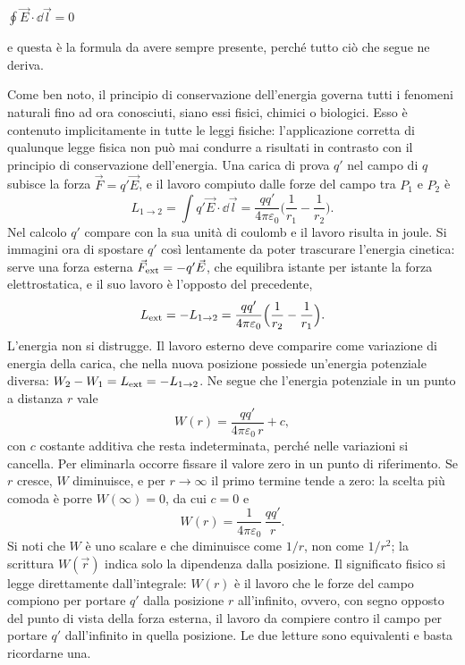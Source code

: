 \documentclass[11pt,a4paper]{article}
\begin{document}
\begin{center}
	\begin{tcolorbox}[colback=blue!5!white, colframe=blue!75!black, halign=center, width=0.55\textwidth, boxrule=1pt, arc=4pt]
		\Large
		$\displaystyle \oint\vec E\cdot\dd\vec l=0$
	\end{tcolorbox}
\end{center}

e questa è la formula da avere sempre presente, perché tutto ciò che segue ne deriva.


Come ben noto, il principio di conservazione dell’energia governa tutti i fenomeni naturali
fino ad ora conosciuti, siano essi fisici, chimici o biologici. Esso è contenuto implicitamente
in tutte le leggi fisiche: l’applicazione corretta di qualunque legge fisica non può mai
condurre a risultati in contrasto con il principio di conservazione dell’energia. Una carica di prova $q'$ nel campo di $q$ subisce la forza $\vec F=q'\vec E$, e il lavoro compiuto dalle forze del campo tra $P_1$ e $P_2$ è
\[
L_{1\to2}=\int q'\vec E\cdot\dd\vec l=\frac{qq'}{4\pi\varepsilon_0}\Big(\frac1{r_1}-\frac1{r_2}\Big).
\]
Nel calcolo $q'$ compare con la sua unità di coulomb e il lavoro risulta in joule. Si immagini ora di spostare $q'$ così lentamente da poter trascurare l'energia cinetica: serve una forza esterna $\vec F_{\rm ext}=-q'\vec E$, che equilibra istante per istante la forza elettrostatica, e il suo lavoro è l'opposto del precedente,
\[
L_{\rm ext}=-L_{1\to2}=\frac{qq'}{4\pi\varepsilon_0}\Big(\frac1{r_2}-\frac1{r_1}\Big).
\]
L'energia non si distrugge. Il lavoro esterno deve comparire come variazione di energia della carica, che nella nuova posizione possiede un'energia potenziale diversa: $W_2-W_1=L_{\rm ext}=-L_{1\to2}$. Ne segue che l'energia potenziale in un punto a distanza $r$ vale
\[
W(r)=\frac{qq'}{4\pi\varepsilon_0\,r}+c ,
\]
con $c$ costante additiva che resta indeterminata, perché nelle variazioni si cancella. Per eliminarla occorre fissare il valore zero in un punto di riferimento. Se $r$ cresce, $W$ diminuisce, e per $r\to\infty$ il primo termine tende a zero: la scelta più comoda è porre $W(\infty)=0$, da cui $c=0$ e
\[
W(r)=\frac{1}{4\pi\varepsilon_0}\,\frac{qq'}{r}.
\]
Si noti che $W$ è uno scalare e che diminuisce come $1/r$, non come $1/r^2$; la scrittura $W(\vec r)$ indica solo la dipendenza dalla posizione. Il significato fisico si legge direttamente dall'integrale: $W(r)$ è il lavoro che le forze del campo compiono per portare $q'$ dalla posizione $r$ all'infinito, ovvero, con segno opposto del punto di vista della forza esterna, il lavoro da compiere contro il campo per portare $q'$ dall'infinito in quella posizione. Le due letture sono equivalenti e basta ricordarne una.
\end{document}
